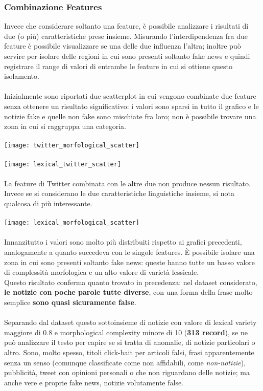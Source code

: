 \documentclass{article}
\begin{document}
\begin{multicols}{2}
				\subsubsection{Combinazione Features}
				Invece che considerare soltanto una feature, è possibile analizzare i risultati di due (o più) caratteristiche prese insieme. Misurando l'interdipendenza fra due feature è possibile visualizzare se una delle due influenza l'altra; inoltre può servire per isolare delle regioni in cui sono presenti soltanto fake news e quindi registrare il range di valori di entrambe le feature in cui si ottiene questo isolamento.\\~\\
				Inizialmente sono riportati due scatterplot in cui vengono combinate due feature senza ottenere un risultato significativo: i valori sono sparsi in tutto il grafico e le notizie fake e quelle non fake sono mischiate fra loro; non è possibile trovare una zona in cui si raggruppa una categoria.
				\\~\\						
				\texttt{[image: twitter\_morfological\_scatter]}
				\\~\\
				\texttt{[image: lexical\_twitter\_scatter]}
				\\~\\
				La feature di Twitter combinata con le altre due non produce nessun risultato.\\Invece se si considerano le due caratteristiche linguistiche insieme, si nota qualcosa di più interessante.
				\\~\\
				\texttt{[image: lexical\_morfological\_scatter]}
				\\~\\
				Innanzitutto i valori sono molto più distribuiti rispetto ai grafici precedenti, analogamente a quanto succedeva con le singole features. È possibile isolare una zona in cui sono presenti soltanto fake news: queste hanno tutte un basso valore di complessità morfologica e un alto valore di varietà lessicale.\\
				Questo risultato conferma quanto trovato in precedenza: nel dataset considerato, \textbf{le notizie con poche parole tutte diverse}, con una forma della frase molto semplice \textbf{sono quasi sicuramente false}.\\~\\
				Separando dal dataset questo sottoinsieme di notizie con valore di lexical variety maggiore di 0.8 e morphological complexity minore di 10 (\textbf{313 record}), se ne può analizzare il testo per capire se si tratta di anomalie, di notizie particolari o altro. Sono, molto spesso, titoli click-bait per articoli falsi, frasi apparentemente senza un senso (comunque classificate come non affidabili, come \textit{non-notizie}), pubblicità, tweet con opinioni personali o che non riguardano delle notizie; ma anche vere e proprie fake news, notizie volutamente false.


\end{multicols}
\end{document}
